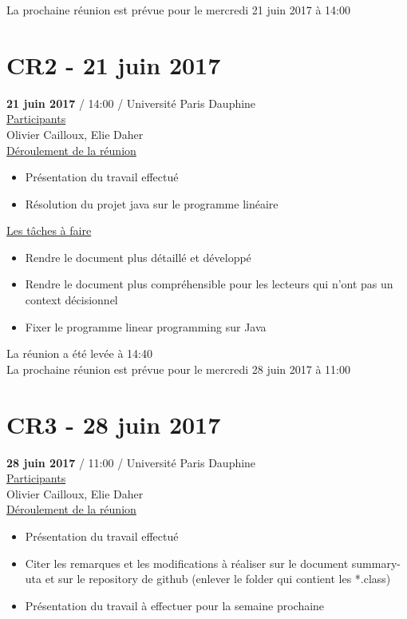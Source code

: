 \documentclass{report}
\begin{document}
\begin{appendices}
La prochaine réunion est prévue pour le mercredi 21 juin 2017 à 14:00


\newpage
\section{CR2 - 21 juin 2017}
\textbf{21 juin 2017} / 14:00 / Université Paris Dauphine \\

\underline{Participants} \\

Olivier Cailloux, Elie Daher\\

\underline{Déroulement de la réunion} \\
\begin{itemize}
	\item Présentation du travail effectué
	\item Résolution du projet java sur le programme linéaire\\
\end{itemize}

\underline{Les tâches à faire} \\
\begin{itemize}
	\item Rendre le document plus détaillé et développé
	\item Rendre le document plus compréhensible pour les lecteurs qui n’ont pas un context décisionnel
	\item Fixer le programme linear programming sur Java\\
\end{itemize}

La réunion a été levée à 14:40\\

La prochaine réunion est prévue pour le mercredi 28 juin 2017 à 11:00
\newpage
\section{CR3 - 28 juin 2017}
\textbf{28 juin 2017} / 11:00 / Université Paris Dauphine \\

\underline{Participants} \\

Olivier Cailloux, Elie Daher\\

\underline{Déroulement de la réunion}\\
\begin{itemize}
	\item Présentation du travail effectué
	\item Citer les remarques et les modifications à réaliser sur le document summary-uta et sur le repository de github (enlever le folder qui contient les *.class)
	\item Présentation du travail à effectuer pour la semaine prochaine\\
\end{itemize}


\end{appendices}
\end{document}
